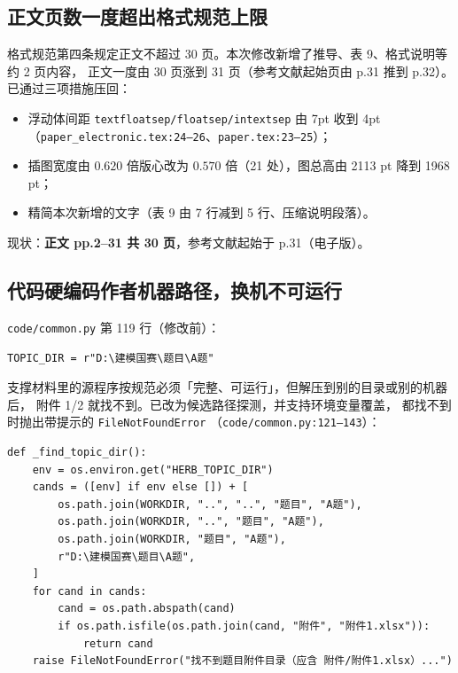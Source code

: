 \documentclass[11pt,a4paper]{ctexart}
\newcommand{\src}[1]{\texttt{#1}}
\newcommand{\loc}[1]{\textcolor{blue!60!black}{#1}}
\begin{document}
\subsection{正文页数一度超出格式规范上限}

格式规范第四条规定正文不超过 30 页。本次修改新增了推导、表 9、格式说明等约 2 页内容，
正文一度由 30 页涨到 31 页（参考文献起始页由 p.31 推到 p.32）。已通过三项措施压回：

\begin{itemize}[leftmargin=1.6em,itemsep=2pt]
  \item 浮动体间距 \src{textfloatsep/floatsep/intextsep} 由 7pt 收到 4pt
  （\src{paper\_electronic.tex:24--26}、\src{paper.tex:23--25}）；
  \item 插图宽度由 $0.620$ 倍版心改为 $0.570$ 倍（21 处），图总高由 2113 pt 降到 1968 pt；
  \item 精简本次新增的文字（表 9 由 7 行减到 5 行、压缩说明段落）。
\end{itemize}

\noindent 现状：\textbf{正文 pp.2--31 共 30 页}，参考文献起始于 p.31（电子版）。

\subsection{代码硬编码作者机器路径，换机不可运行}

\loc{\src{code/common.py} 第 119 行（修改前）}：
\begin{lstlisting}[style=old]
TOPIC_DIR = r"D:\建模国赛\题目\A题"
\end{lstlisting}
支撑材料里的源程序按规范必须「完整、可运行」，但解压到别的目录或别的机器后，
附件 1/2 就找不到。已改为候选路径探测，并支持环境变量覆盖，
都找不到时抛出带提示的 \src{FileNotFoundError}
（\src{code/common.py:121--143}）：

\begin{lstlisting}[style=new]
def _find_topic_dir():
    env = os.environ.get("HERB_TOPIC_DIR")
    cands = ([env] if env else []) + [
        os.path.join(WORKDIR, "..", "..", "题目", "A题"),
        os.path.join(WORKDIR, "..", "题目", "A题"),
        os.path.join(WORKDIR, "题目", "A题"),
        r"D:\建模国赛\题目\A题",
    ]
    for cand in cands:
        cand = os.path.abspath(cand)
        if os.path.isfile(os.path.join(cand, "附件", "附件1.xlsx")):
            return cand
    raise FileNotFoundError("找不到题目附件目录（应含 附件/附件1.xlsx）...")
\end{lstlisting}

\end{document}
